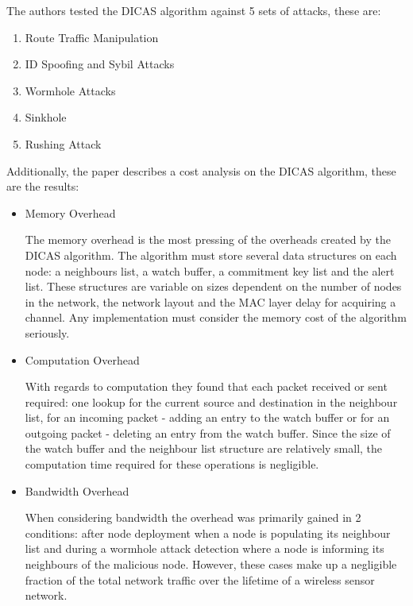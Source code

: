 The authors tested the DICAS algorithm against 5 sets of attacks, these are:
\begin{enumerate}

\item Route Traffic Manipulation

\item ID Spoofing and Sybil Attacks

\item Wormhole Attacks

\item Sinkhole

\item Rushing Attack

\end{enumerate}

Additionally, the paper describes a cost analysis on the DICAS algorithm, these are the results: 
\begin{itemize}
\item Memory Overhead

The memory overhead is the most pressing of the overheads created by the DICAS algorithm. The algorithm must store several data structures on each node: a neighbours list, a watch buffer, a commitment key list and the alert list. These structures are variable on sizes dependent on the number of nodes in the network, the network layout and the MAC layer delay for acquiring a channel. Any implementation must consider the memory cost of the algorithm seriously.

\item Computation Overhead

With regards to computation they found that each packet received or sent required: one lookup for the current source and destination in the neighbour list, for an incoming packet - adding an entry to the watch buffer or for an outgoing packet - deleting an entry from the watch buffer. Since the size of the watch buffer and the neighbour list structure are relatively small, the computation time required for these operations is negligible.

\item Bandwidth Overhead

When considering bandwidth the overhead was primarily gained in 2 conditions: after node deployment when a node is populating its neighbour list and during a wormhole attack detection where a node is informing its neighbours of the malicious node. However, these cases make up a negligible fraction of the total network traffic over the lifetime of a wireless sensor network.
\end{itemize}

